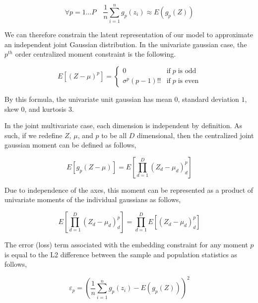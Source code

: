 \documentclass[10pt,twocolumn,letterpaper]{article}
\begin{document}
\begin{equation}
	\forall p=1 \dots P \quad
	\frac{1}{n} \sum_{i=1}^n g_p(z_i) \approx E(g_p(Z))
\end{equation}

We can therefore constrain the latent representation of our model to approximate an independent joint Gaussian distribution. 
In the univariate gaussian case, the $p^{th}$ order centralized moment constraint is the following.

\begin{equation}
	E\left[ (Z-\mu)^p \right] = 
	\begin{cases} 
		0 &  \text{if} \; p \; \text{is odd} \\
		\sigma^p(p - 1)!! & \text{if} \; p \; \text{is even}
	\end{cases}
\end{equation}

By this formula, the univariate unit gaussian has mean $0$, standard deviation $1$, skew $0$, and kurtosis 3.

In the joint multivariate case, each dimension is independent by definition.  As such, if we redefine $Z$, $\mu$, and $p$ to be all $D$ dimensional, then the centralized joint gaussian moment can be defined as follows,

\begin{equation}
	E\left[g_p(Z - \mu)\right] = E\left[ \prod_{d=1}^D (Z_d - \mu_d)^p_d \right]
\end{equation}

Due to independence of the axes, this moment can be represented as a product of univariate moments of the individual gaussians as follows,

\begin{equation}
	E\left[ \prod_{d=1}^D (Z_d - \mu_d)^p_d \right] = \prod_{d=1}^D E\left[ (Z_d - \mu_d)^p_d \right]
\end{equation}

The error (loss) term associated with the embedding constraint for any moment $p$ is equal to the L2 difference between the sample and population statistics as follows,

\begin{equation}
	\varepsilon_p = \left( \frac{1}{n} \sum_{i=1}^n g_p(z_i) - E(g_p(Z)) \right)^2
\end{equation}
\end{document}
